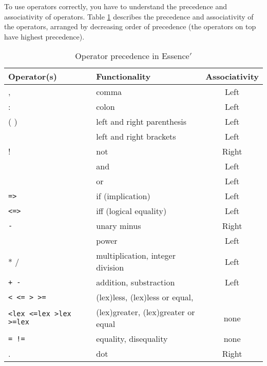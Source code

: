 \documentclass{article}
\begin{document}
To use operators correctly, you have to understand the precedence and associativity of operators. 
Table \ref{tab:precedence} 
describes the precedence and associativity of the operators, arranged by decreasing order of precedence (the operators on top have highest precedence).



\begin{table}  
    \begin{center}
    \begin{tabular}{|l|lc|}
 
      \hline
       Operator(s) & Functionality & Associativity \\
       \hline
       \hline
       ,   & comma & Left \\   
       \hline
       :   & colon & Left \\
       \hline
       ( ) & left and right parenthesis & Left \\
       \hline
       \verb1[ ]1 & left and right brackets & Left \\
       \hline
       ! & not & Right \\  
       \hline
       \verb1/\1 & and & Left \\ 
       \hline
       \verb1\/1 & or & Left \\ 
       \hline
        {\tt =>} & if (implication)  & Left \\ 
	\hline
        {\tt <=>} & iff (logical equality) & Left \\ 
	\hline
        {\tt -} & unary minus & Right \\
	\hline
        \verb1^1 & power & Left \\ 
	\hline
        * / & multiplication, integer division & Left \\ 
	\hline
        {\tt + -} & addition, substraction &  Left \\
	\hline
        {\tt < <= > >= } & (lex)less, (lex)less or equal, &  \\ 
	{\tt <lex <=lex >lex >=lex } & (lex)greater, (lex)greater or equal & none \\ 
	\hline
        {\tt = !=} & equality, disequality & none \\
	\hline
        . & dot & Right \\ 
	\hline

      \end{tabular}
\end{center}
    \caption{Operator precedence in {\sc Essence}$'$}

\label{tab:precedence}
\end{table}
\end{document}
